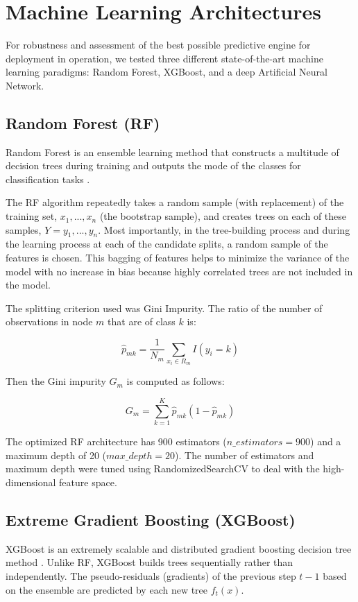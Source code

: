 \documentclass[journal, 10pt, twocolumn]{IEEEtran}
\begin{document}
\section{Machine Learning Architectures}

For robustness and assessment of the best possible predictive engine for deployment in operation, we tested three different state-of-the-art machine learning paradigms: Random Forest, XGBoost, and a deep Artificial Neural Network.

\subsection{Random Forest (RF)}
Random Forest is an ensemble learning method that constructs a multitude of decision trees during training and outputs the mode of the classes for classification tasks \cite{b26}.

The RF algorithm repeatedly takes a random sample (with replacement) of the training set, $x_1, ..., x_n$ (the bootstrap sample), and creates trees on each of these samples, $Y = y_1, ..., y_n$. Most importantly, in the tree-building process and during the learning process at each of the candidate splits, a random sample of the features is chosen. This bagging of features helps to minimize the variance of the model with no increase in bias because highly correlated trees are not included in the model.

The splitting criterion used was Gini Impurity. The ratio of the number of observations in node $m$ that are of class $k$ is:

\begin{equation}
\hat{p}_{mk} = \frac{1}{N_m} \sum_{x_i \in R_m} I(y_i = k)
\end{equation}

Then the Gini impurity $G_m$ is computed as follows:

\begin{equation}
G_m = \sum_{k=1}^{K} \hat{p}_{mk} (1 - \hat{p}_{mk})
\end{equation}

The optimized RF architecture has 900 estimators ($n\_estimators=900$) and a maximum depth of 20 ($max\_depth=20$). The number of estimators and maximum depth were tuned using RandomizedSearchCV to deal with the high-dimensional feature space.

\subsection{Extreme Gradient Boosting (XGBoost)}
XGBoost is an extremely scalable and distributed gradient boosting decision tree method \cite{b29}. Unlike RF, XGBoost builds trees sequentially rather than independently. The pseudo-residuals (gradients) of the previous step $t-1$ based on the ensemble are predicted by each new tree $f_t(x)$.
\end{document}
